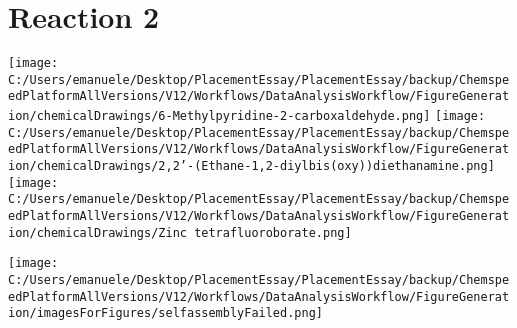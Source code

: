 \documentclass{article}%
\begin{document}
\section*{Reaction 2}%
%
\begin{scheme}[H]%
\begin{minipage}{0.5\textwidth}%
\texttt{[image: C:/Users/emanuele/Desktop/PlacementEssay/PlacementEssay/backup/ChemspeedPlatformAllVersions/V12/Workflows/DataAnalysisWorkflow/FigureGeneration/chemicalDrawings/6-Methylpyridine-2-carboxaldehyde.png]}%
\texttt{[image: C:/Users/emanuele/Desktop/PlacementEssay/PlacementEssay/backup/ChemspeedPlatformAllVersions/V12/Workflows/DataAnalysisWorkflow/FigureGeneration/chemicalDrawings/2,2'-(Ethane-1,2-diylbis(oxy))diethanamine.png]}%
\texttt{[image: C:/Users/emanuele/Desktop/PlacementEssay/PlacementEssay/backup/ChemspeedPlatformAllVersions/V12/Workflows/DataAnalysisWorkflow/FigureGeneration/chemicalDrawings/Zinc tetrafluoroborate.png]}%
\end{minipage}%
\begin{minipage}{0.5\textwidth}%
\begin{center}%
\texttt{[image: C:/Users/emanuele/Desktop/PlacementEssay/PlacementEssay/backup/ChemspeedPlatformAllVersions/V12/Workflows/DataAnalysisWorkflow/FigureGeneration/imagesForFigures/selfassemblyFailed.png]}%
\end{center}%
\end{minipage}%
\caption{Self-assembly of components 8, 19, with Zinc(II) in a 3.0:1.5:1.0 molar ratio in CH$_3$CN at 60\textdegree C for 40h. These are the reagents (starting materials) for reaction 2.}%
\end{scheme}%
\end{document}
